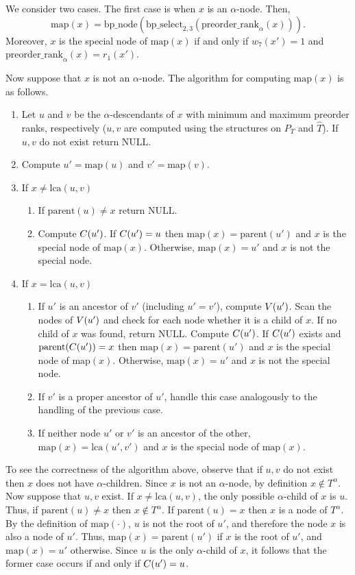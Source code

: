 \documentclass[12pt]{article}
\newcommand{\NULL}{\mathrm{NULL}}
\newcommand{\parentb}{\mathrm{parent}}
\newcommand{\preorderrankb}{\mathrm{preorder\_rank}}
\newcommand{\lcab}{\mathrm{lca}}
\newcommand{\bpselectb}{\mathrm{bp\_select}}
\newcommand{\bpnodeb}{\mathrm{bp\_node}}
\newcommand{\preorderrank}[2]{\preorderrankb_{#1}(#2)}
\newcommand{\parentx}[1]{\parentb(#1)}
\newcommand{\lcax}[2]{\lcab(#1,#2)}
\newcommand{\idxle}{2}
\newcommand{\idxgt}{3}
\newcommand{\idxspecial}{7}
\newcommand{\bpselect}[2]{\bpselectb_{#1}(#2)}
\newcommand{\bpnode}[1]{\bpnodeb(#1)}
\newcommand{\map}[1]{\mathrm{map}(#1)}
\begin{document}
We consider two cases. The first case is when $x$ is an $\alpha$-node.
Then,
\[ \map{x}=\bpnode{\bpselect{\idxle,\idxgt}{\preorderrank{\alpha}{x}}}. \]
Moreover, $x$ is the special node of $\map{x}$ if and only if
$w_{\idxspecial}(x')=1$ and $\preorderrank{\alpha}{x}=r_1(x')$.

Now suppose that $x$ is not an $\alpha$-node.
The algorithm for computing $\map{x}$ is as follows.
\begin{enumerate}
\item
Let $u$ and $v$ be the $\alpha$-descendants of $x$ with minimum and maximum
preorder ranks, respectively
($u,v$ are computed using the structures on $P_T$ and $\hat{T}$).
If $u,v$ do not exist return $\NULL$.
\item
Compute $u'=\map{u}$ and $v'=\map{v}$.
\item
If $x\neq \lcax{u}{v}$
\begin{enumerate}
\item
If $\parentx{u} \neq x$ return $\NULL$.
\item
Compute $C(u')$.
If $C(u')=u$ then
$\map{x}=\parentx{u'}$ and $x$ is the special node of $\map{x}$.
Otherwise, $\map{x}=u'$ and $x$ is not the special node.
\label{alg:x-not-lca}
\end{enumerate}
\item
If $x=\lcax{u}{v}$
\begin{enumerate}
\item
If $u'$ is an ancestor of $v'$ (including $u'=v'$), compute $V(u')$.
Scan the nodes of $V(u')$ and check for each node whether it is a child of $x$.
If no child of $x$ was found, return $\NULL$.
Compute $C(u')$. If $C(u')$ exists and $\parentx{\C{u'}}=x$
then $\map{x}=\parentx{u'}$ and $x$ is the special node of $\map{x}$.
Otherwise, $\map{x}=u'$ and $x$ is not the special node.
\item If $v'$ is a proper ancestor of $u'$, 
handle this case analogously to the handling of the previous case.
\item If neither node $u'$ or $v'$ is an ancestor of the other,
$\map{x}=\lcax{u'}{v'}$ and $x$ is the special node of $\map{x}$.
\end{enumerate}
\end{enumerate}
To see the correctness of the algorithm above, observe that
if $u,v$ do not exist then $x$ does not have $\alpha$-children.
Since $x$ is not an $\alpha$-node, by definition $x \notin T^\alpha$.
Now suppose that $u,v$ exist.
If $x \neq \lcax{u}{v}$, the only possible $\alpha$-child of $x$ is $u$.
Thus, if $\parentx{u}\neq x$ then $x\notin T^\alpha$.
If $\parentx{u} = x$ then $x$ is a node of $T^\alpha$.
By the definition of $\map{\cdot}$, $u$ is not the root of $u'$,
and therefore the node $x$ is also a node of $u'$.
Thus, $\map{x}=\parentx{u'}$ if $x$ is the root of $u'$, and
$\map{x}=u'$ otherwise.
Since $u$ is the only $\alpha$-child of $x$, it follows that the former case
occurs if and only if $C(u')=u$.
\end{document}
